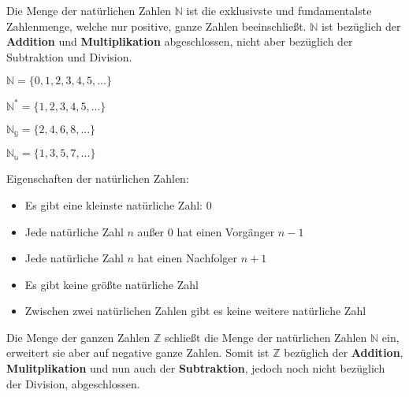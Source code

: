 



\thispagestyle{plain}



Die Menge der nat\"{u}rlichen Zahlen $\mathbb{N}$ ist die exklusivste und fundamentalste Zahlenmenge, welche nur positive, ganze Zahlen beeinschlie\ss{}t. $\mathbb{N}$ ist bez\"{u}glich der \textbf{Addition} und \textbf{Multiplikation} abgeschlossen, nicht aber bez\"{u}glich der Subtraktion und Division.

$\mathbb{N} = \{0, 1, 2, 3, 4, 5, ...\}$

$\mathbb{N^*} = \{1, 2, 3, 4, 5, ...\}$

$\mathbb{N_g} = \{2, 4, 6, 8, ...\}$

$\mathbb{N_u} = \{1, 3, 5, 7, ...\}$

Eigenschaften der nat\"{u}rlichen Zahlen:

\begin{itemize}
	\item Es gibt eine kleinste nat\"{u}rliche Zahl: 0
	\item Jede nat\"{u}rliche Zahl $n$ au\ss{}er 0 hat einen Vorg\"{a}nger $n - 1$
	\item Jede nat\"{u}rliche Zahl $n$ hat einen Nachfolger $n + 1$
	\item Es gibt keine gr\"{o}\ss{}te nat\"{u}rliche Zahl
	\item Zwischen zwei nat\"{u}rlichen Zahlen gibt es keine weitere nat\"{u}rliche Zahl
\end{itemize}


Die Menge der ganzen Zahlen $\mathbb{Z}$ schlie\ss{}t die Menge der nat\"{u}rlichen Zahlen $\mathbb{N}$ ein, erweitert sie aber auf negative ganze Zahlen. Somit ist $\mathbb{Z}$ bez\"{u}glich der \textbf{Addition}, \textbf{Mulitplikation} und nun auch der \textbf{Subtraktion}, jedoch noch nicht bez\"{u}glich der Division, abgeschlossen.

\begin{figure}[h!]
\end{figure}

